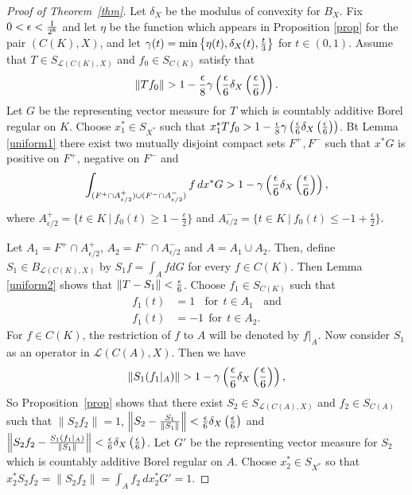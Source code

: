 \documentclass[a4paper]{amsart}
\theoremstyle{plain}
\theoremstyle{definition}
\begin{document}
\begin{proof}[Proof of Theorem~\ref{thm}]
Let $\delta_X$ be the modulus of convexity for $B_X$. Fix $0<\epsilon<{{1}\over{2^8}}$ and let $\eta$ be the function which appears in Proposition \ref{prop} for the pair $(C(K), X)$, and let $\gamma(t)=\min\left\{\eta(t),\delta_X(t),{{t}\over{3}}\right\}$ for $t \in (0,1)$. Assume that $T\in S_{\mathcal{L}(C(K), X)}$ and $f_0\in S_{C(K)}$ satisfy that $$\|Tf_0\|>1-{{\epsilon}\over{8}}\gamma\left({{\epsilon}\over{6}}\delta_X\left({{\epsilon}\over{6}}\right)\right).$$
Let $G$ be the representing vector measure for $T$ which is countably additive Borel regular on $K$.
 Choose $x_1^*\in S_{X^*}$ such that $x_1^*Tf_0>1-{{\epsilon}\over{8}}\gamma\left({{\epsilon}\over{6}}\delta_X\left({{\epsilon}\over{6}}\right)\right)$.  Bt Lemma \ref{uniform1} there exist two mutually disjoint compact sets $F^+, F^-$ such that $x^*G$ is positive on $F^+$, negative on $F^-$ and $$\int_{(F^+\cap A^+_{\epsilon/2})\cup(F^-\cap A^-_{\epsilon/2})} f \, dx^*G>1-\gamma\left({{\epsilon}\over{6}}\delta_X\left({{\epsilon}\over{6}}\right)\right),$$ where $A^+_{\epsilon/2}=\{t\in K~|~f_0(t){\geqslant}1-\frac\epsilon2\}$ and $A^-_{\epsilon/2}=\{t\in K~|~f_0(t){\leqslant}-1+\frac\epsilon2\}$.

Let $A_1 = F^+\cap A^+_{\epsilon/2}$, $A_2= F^-\cap A^-_{\epsilon/2}$ and $A=A_1\cup A_2$. Then, define $S_1\in B_{\mathcal{L}(C(K), X)}$ by $S_1f=\int_A f dG$ for every $f\in C(K)$.
Then Lemma \ref{uniform2} shows that $\|T-S_1\|<{{\epsilon}\over{6}}$.
Choose $f_1\in S_{C(K)}$ such that
\begin{align*}
    f_1(t)&= 1\ \ \ \ \text{for}\  \ t\in A_1\ \ \ \  \text{and}\\
   f_1(t)&=-1 \ \ \text{for}\ \ t\in A_2.
\end{align*}
For $f\in C(K)$, the restriction of $f$ to $A$ will be denoted by $f|_A$. Now consider $S_1$ as an operator in $\mathcal{L}(C(A),X)$. Then we have
$$\|S_1(f_1|_A)\|>1-\gamma\left({{\epsilon}\over{6}}\delta_X\left({{\epsilon}\over{6}}\right)\right),$$
So Proposition~\ref{prop}  shows that   there exist $S_2\in S_{\mathcal{L}(C(A),X)}$ and $f_2\in S_{C(A)}$ such that $\|S_2f_2\|=1$, $\left\|S_2-{{S_1}\over{\|S_1\|}}\right\|<{{\epsilon}\over{6}}\delta_X\left({{\epsilon}\over{6}}\right)$ and $\left\|S_2f_2-{{S_1(f_1|_A)}\over{\|S_1\|}}\right\|<{{\epsilon}\over{6}}\delta_X\left({{\epsilon}\over{6}}\right)$.
Let $G'$ be the representing vector measure for $S_2$ which is  countably additive Borel regular on $A$. Choose $x^*_2\in S_{X^*}$ so that $x^*_2S_2f_2=\|S_2f_2\|=\int_{A}f_2\, dx^*_2G'=1$.


\end{proof}
\end{document}
